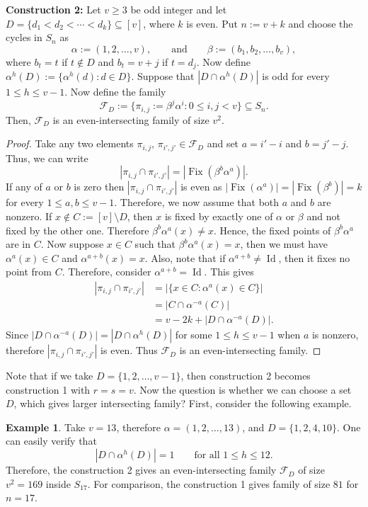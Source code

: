 \documentclass[12pt]{article}
\theoremstyle{definition}
\newtheorem*{example}{Example}
\newcommand{\1}{\mathbf 1}
\newcommand{\Fix}{\operatorname{Fix}}
\begin{document}
\textbf{Construction 2:} Let $v\geq 3$ be odd integer and let $D=\{d_1<d_2<\cdots<d_k\}\subseteq [v]$, where $k$ is even. Put $n:=v+k$ and choose the  cycles in $S_n$ as $$\alpha:=(1,2,\ldots,v),\qquad\text{and}\qquad \beta:=(b_1,b_2,\ldots,b_{v}),$$
where $b_t=t$ if $t\notin D$ and $b_t=v+j$ if $t=d_j$. Now define $\alpha^h(D):=\{\alpha^h(d):d\in D\}$. Suppose that $|D\cap \alpha^h(D)|$ is odd for every $1\leq h\leq v-1$. Now define the family
$$\mathcal{F}_D:=\{\pi_{i,j}:=\beta^j\alpha^i: 0\leq i,j<v\}\subseteq S_n.$$
Then, $\mathcal{F}_D$ is an even-intersecting family of size $v^2$.
\begin{proof}
    Take any two elements $\pi_{i,j},\,\pi_{i',j'}\in \mathcal{F}_D$ and set $a=i'-i$ and $b=j'-j$. Thus, we can write 
    $$|\pi_{i,j}\cap \pi_{i',j'}|=|\Fix\left(\beta^b\alpha^a\right)|.$$
    If any of $a$ or $b$ is zero then $|\pi_{i,j}\cap \pi_{i',j'}|$ is even as $|\Fix\left(\alpha^a\right)|=|\Fix\left(\beta^b\right)|=k$ for every $1\leq a,b\leq v-1$. Therefore, we now assume that both $a$ and $b$ are nonzero. If $x\notin C:=[v]\setminus D$, then $x$ is fixed by exactly one of $\alpha$ or $\beta$ and not  fixed by the other one. Therefore $\beta^b\alpha^a(x)\neq x$. Hence, the fixed points of $\beta^b\alpha^a$ are in $C$. 
    Now suppose $x\in C$ such that $\beta^b\alpha^a(x)= x$, then we must have $\alpha^a(x)\in C$ and $\alpha^{a+b}(x)=x$. Also, note that if $\alpha^{a+b}\neq \operatorname{Id}$, then it fixes no point from $C$. Therefore, consider $\alpha^{a+b}=\operatorname{Id}$. This gives
    \begin{align*}
        |\pi_{i,j}\cap \pi_{i',j'}|&=|\{x\in C:\alpha^a(x)\in C\}|\\
        &=|C\cap \alpha^{-a}(C)|\\
        &=v-2k+|D\cap \alpha^{-a}(D)|.
    \end{align*}
    Since $|D\cap \alpha^{-a}(D)|=|D\cap \alpha^{h}(D)|$ for some $1\leq h\leq v-1$ when $a$ is nonzero, therefore $|\pi_{i,j}\cap \pi_{i',j'}|$ is even. Thus $\mathcal{F}_D$ is an even-intersecting family.
\end{proof}
Note that if we take $D=\{1,2,\ldots,v-1\}$, then construction 2 becomes construction 1 with $r=s=v$. Now the question is whether we can choose a set $D$, which gives larger intersecting family? First, consider the following example.
\begin{example}
    Take $v=13$, therefore $\alpha=(1,2,\ldots,13)$, and $D=\{1,2,4,10\}$. One can easily verify that 
    $$|D\cap \alpha^h(D)|=1\qquad \text{for all }1\leq h\leq 12.$$
    Therefore, the construction 2 gives an even-intersecting family $\mathcal{F}_D$ of size $v^2=169$ inside $S_{17}$. For comparison, the construction 1 gives family of size $81$ for $n=17$.
\end{example}
\end{document}
